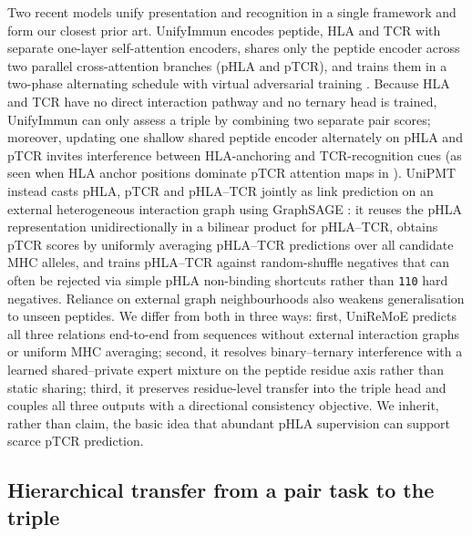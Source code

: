 \documentclass[webpdf,modern,large,namedate]{oup-authoring-template}
\theoremstyle{thmstyleone}
\theoremstyle{thmstyletwo}
\theoremstyle{thmstylethree}
\newcommand{\method}{UniReMoE}
\newcommand{\PH}{pHLA}
\newcommand{\PT}{pTCR}
\newcommand{\PHT}{pHLA--TCR}
\begin{document}
Two recent models unify presentation and recognition in a single framework and
form our closest prior art. UnifyImmun encodes peptide, HLA and TCR with
separate one-layer self-attention encoders, shares only the peptide encoder
across two parallel cross-attention branches (\PH{} and \PT{}), and trains them
in a two-phase alternating schedule with virtual adversarial training
\citep{yu2025unifyimmun}. Because HLA and TCR have no direct interaction
pathway and no ternary head is trained, UnifyImmun can only assess a triple by
combining two separate pair scores; moreover, updating one shallow shared
peptide encoder alternately on \PH{} and \PT{} invites interference between
HLA-anchoring and TCR-recognition cues (as seen when HLA anchor positions
dominate \PT{} attention maps in \citet{yu2025unifyimmun}). UniPMT instead
casts \PH{}, \PT{} and \PHT{} jointly as link prediction on an external
heterogeneous interaction graph using GraphSAGE \citep{zhao2025unipmt}: it
reuses the \PH{} representation unidirectionally in a bilinear product for
\PHT{}, obtains \PT{} scores by uniformly averaging \PHT{} predictions over all
candidate MHC alleles, and trains \PHT{} against random-shuffle negatives that
can often be rejected via simple \PH{} non-binding shortcuts rather than
\texttt{110} hard negatives. Reliance on external graph neighbourhoods also
weakens generalisation to unseen peptides. We differ from both in three ways:
first, \method{} predicts all three relations end-to-end from sequences without
external interaction graphs or uniform MHC averaging; second, it resolves
binary--ternary interference with a learned shared--private expert mixture on
the peptide residue axis rather than static sharing; third, it preserves
residue-level transfer into the triple head and couples all three outputs with
a directional consistency objective. We inherit, rather than claim, the basic
idea that abundant \PH{} supervision can support scarce \PT{} prediction.

\subsection{Hierarchical transfer from a pair task to the
triple}\label{sec:related:transfer}
\end{document}
